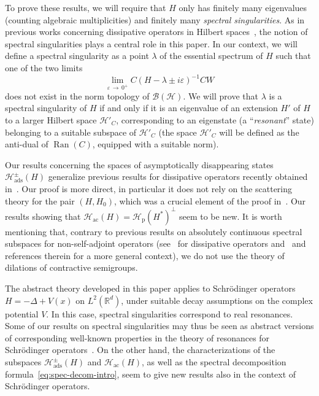 \documentclass[AHL,Unicode,longabstracts,published]{cedram}
\newcommand{\Hi}{\mathcal{H}}
\newcommand{\R}{\mathbb{R}}
\newcommand{\rmp}{\mathrm{p}}
\newcommand{\acr}{\mathrm{ac}}
\newcommand{\ads}{\mathrm{ads}}
\newcommand{\clB}{\mathcal{B}}
\DeclareMathOperator{\Ran}{Ran}
\newcommand{\Hi}{\mathcal{H}}
\newcommand{\rmp}{\mathrm{p}}
\newcommand{\R}{\mathbb{R}}
\newcommand{\acr}{\mathrm{ac}}
\begin{document}
To prove these results, we will require that $H$ only has finitely many eigenvalues (counting algebraic multiplicities) and finitely many \emph{spectral singularities}. As in previous works concerning dissipative operators in Hilbert spaces~\cite{Fa21_01,FaFr18_01,FaNi18_01}, the notion of spectral singularities plays a central role in this paper. In our context, we will define a spectral singularity as a point $\lambda$ of the essential spectrum of $H$ such that one of the two limits
\begin{equation*}
\lim_{\varepsilon\,\to\,0^+}C(H-\lambda\pm i\varepsilon)^{-1}CW
\end{equation*}
does not exist in the norm topology of $\clB(\Hi)$. We will prove that $\lambda$ is a spectral singularity of $H$ if and only if it is an eigenvalue of an extension $H'$ of $H$ to a larger Hilbert space $\Hi'_C$, corresponding to an eigenstate (a ``\emph{resonant}'' state) belonging to a suitable subspace of $\Hi'_C$ (the space $\Hi'_C$ will be defined as the anti-dual of $\Ran(C)$, equipped with a suitable norm).

Our results concerning the spaces of asymptotically disappearing states $\Hi_{\ads}^\pm(H)$ generalize previous results for dissipative operators recently obtained in~\cite{FaFr18_01}. Our proof is more direct, in particular it does not rely on the scattering theory for the pair $(H,H_0)$, which was a crucial element of the proof in~\cite{FaFr18_01}. Our results showing that $\Hi_{\acr}(H)=\Hi_{\rmp}(H^*)^\perp$ seem to be new. It is worth mentioning that, contrary to previous results on absolutely continuous spectral subspaces for non-self-adjoint operators (see~\cite{Da80_01} for dissipative operators and~\cite{KiNa09_01,Na76_01} and references therein for a more general context), we do not use the theory of dilations of contractive semigroups.

The abstract theory developed in this paper applies to Schr\"odinger operators $H=-\Delta+V(x)$ on $L^2(\R^d)$, under suitable decay assumptions on the complex potential $V$. In this case, spectral singularities correspond to real resonances. Some of our results on spectral singularities may thus be seen as abstract versions of corresponding well-known properties in the theory of resonances for Schr\"odinger operators~\cite{DyZw19_01}. On the other hand, the characterizations of the subspaces $\Hi_{\ads}^\pm(H)$ and $\Hi_{\acr}(H)$, as well as the spectral decomposition formula~\eqref{eq:spec-decom-intro}, seem to give new results also in the context of Schr\"odinger operators.
\end{document}
